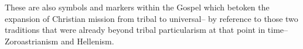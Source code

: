 \begin{footnotesize}
\begin{sffamily}
These are also symbols and markers within the Gospel which betoken the expansion of Christian mission from tribal to universal-- by reference to those two traditions that were already beyond tribal particularism at that point in time-- Zoroastrianism and Hellenism.


\hfill


\end{sffamily}
\end{footnotesize}

